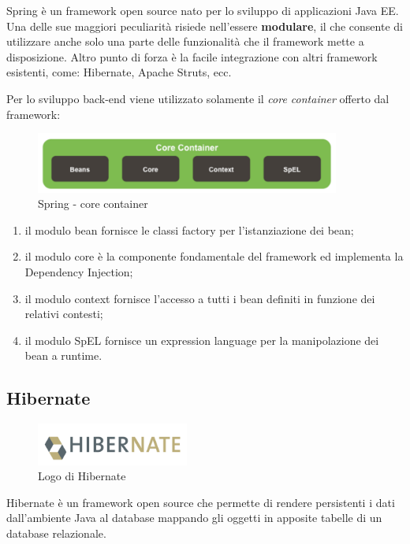 \noindent Spring è un framework open source nato per lo sviluppo di applicazioni Java EE. Una delle sue maggiori peculiarità risiede nell'essere \textbf{modulare}, il che consente di utilizzare anche solo una parte delle funzionalità che il framework mette a disposizione. Altro punto di forza è la facile integrazione con altri framework esistenti, come: Hibernate, Apache Struts, ecc. 

\setlength{\parskip}{3ex}

\noindent Per lo sviluppo back-end viene utilizzato solamente il  \textit{core container} offerto dal framework:

\begin{figure}[!h]
	\centering
	\includegraphics[width=10cm]{../images/Spring-core.png}
	\caption{Spring - core container}
\end{figure}

\begin{enumerate}
\item il modulo bean fornisce le classi factory per l’istanziazione dei bean;
\item il modulo core è la componente fondamentale del framework ed implementa la Dependency Injection;
\item il modulo context fornisce l’accesso a tutti i bean definiti in funzione dei relativi contesti;
\item il modulo SpEL fornisce un expression language per la manipolazione dei bean a runtime.
\end{enumerate}

\pagebreak

\subsection{Hibernate}

\begin{figure}[!h]
	\centering
	\includegraphics[width=5cm]{../images/Hibernate-logo.png}
	\caption{Logo di Hibernate}
\end{figure}

\noindent Hibernate è un framework open source che permette di  rendere persistenti i dati dall'ambiente Java al database mappando gli oggetti in apposite tabelle di un database relazionale.

